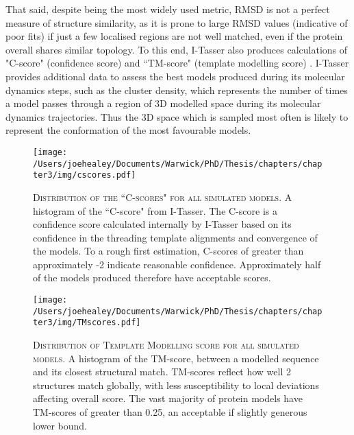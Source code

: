 That said, despite being the most widely used metric, RMSD is not a perfect measure of structure similarity, as it is prone to large RMSD values (indicative of poor fits) if just a few localised regions are not well matched, even if the protein overall shares similar topology. To this end, I-Tasser also produces calculations of "C-score" (confidence score) and ``TM-score" (template modelling score) \citep{Zhang2005}. I-Tasser provides additional data to assess the best models produced during its molecular dynamics steps, such as the cluster density, which represents the number of times a model passes through a region of 3D modelled space during its molecular dynamics trajectories. Thus the 3D space which is sampled most often is likely to represent the conformation of the most favourable models.

\begin{figure}[p]
\centering
{}
\texttt{[image: /Users/joehealey/Documents/Warwick/PhD/Thesis/chapters/chapter3/img/cscores.pdf]}
	\captionsetup{singlelinecheck=off, justification=justified, font=footnotesize, aboveskip=7pt}
	\caption[I-Tasser model accuracy distribution - C-score]{\textsc{\normalsize Distribution of the ``C-scores" for all simulated models.}\vspace{0.1cm} \newline A histogram of the ``C-score" from I-Tasser. The C-score is a confidence score calculated internally by I-Tasser based on its confidence in the threading template alignments and convergence of the models. To a rough first estimation, C-scores of greater than approximately -2 indicate reasonable confidence. Approximately half of the models produced therefore have acceptable scores.}
	\label{cscorehist}
\end{figure}
\begin{figure}[p]
\centering
{}
\texttt{[image: /Users/joehealey/Documents/Warwick/PhD/Thesis/chapters/chapter3/img/TMscores.pdf]}
	\captionsetup{singlelinecheck=off, justification=justified, font=footnotesize, aboveskip=7pt}
	\caption[I-Tasser model accuracy distribution TM-score]{\textsc{\normalsize Distribution of Template Modelling score for all simulated models.}\vspace{0.1cm} \newline A histogram of the TM-score, between a modelled sequence and its closest structural match. TM-scores reflect how well 2 structures match globally, with less susceptibility to local deviations affecting overall score. The vast majority of protein models have TM-scores of greater than 0.25, an acceptable if slightly generous lower bound.}
	\label{tmscorehist}
\end{figure}

